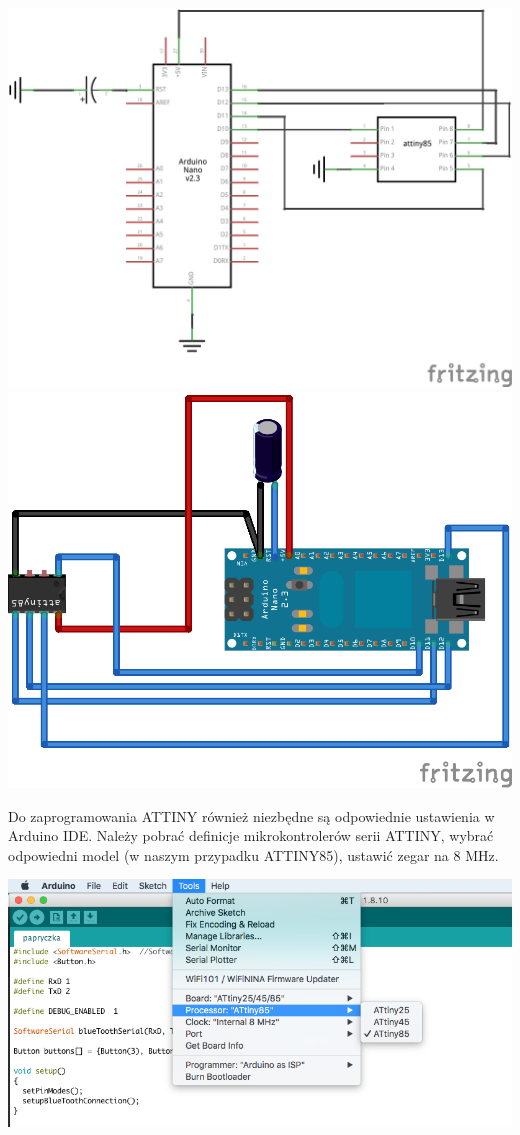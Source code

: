 \documentclass[eng,printmode]{mgr}
\begin{document}
\includegraphics[width=\textwidth]{attiny-prog-schem}
\newpage
\includegraphics[width=\textwidth]{attiny-prog-bb}

Do zaprogramowania ATTINY również niezbędne są odpowiednie ustawienia w Arduino IDE.
Należy pobrać definicje mikrokontrolerów serii ATTINY, wybrać odpowiedni model (w naszym przypadku ATTINY85), ustawić zegar na 8 MHz.

\includegraphics[width=\textwidth]{arduino-settings}
\end{document}
